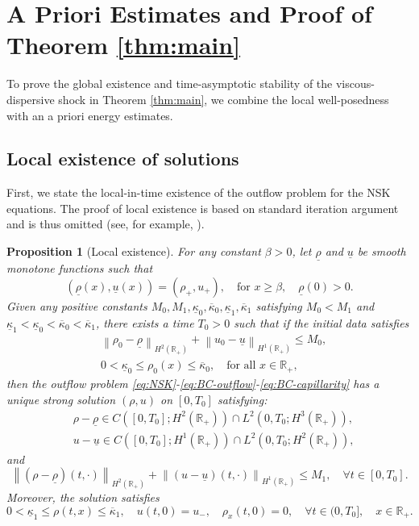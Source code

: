 \documentclass[11pt,reqno]{amsart}
\newtheorem{proposition}{Proposition}[section]
\numberwithin{equation}{section} %
\newcommand{\norm}[1]{\left\lVert#1\right\rVert}
\begin{document}
\section{A Priori Estimates and Proof of Theorem \ref{thm:main}} \label{sec:apriori}
\setcounter{equation}{0}

To prove the global existence and time-asymptotic stability of the viscous-dispersive shock in Theorem \ref{thm:main}, we combine the local well-posedness with an a priori energy estimates.

\subsection{Local existence of solutions} 
First, we state the local-in-time existence of the outflow problem for the NSK equations. %
The proof of local existence is based on standard iteration argument and is thus omitted (see, for example, \cite{HKKL25-JMAA}).

\begin{proposition}[Local existence]\label{prop:loc} 
    For any constant $\beta > 0 $, let $\underline{\rho}$ and $\underline{u}$ be smooth monotone functions such that
    \[
    (\underline{\rho}(x), \underline{u}(x)) = (\rho_+, u_+), \quad \text{for } x \geq \beta, \quad \underline{\rho}(0) > 0.
    \]
    Given any positive constants $M_0, M_1, \underline{\kappa}_0, \overline{\kappa}_0,  \underline{\kappa}_1, \overline{\kappa}_1$ satisfying $M_0 < M_1$ and $\underline{\kappa}_1 < \underline{\kappa}_0 < \overline{\kappa}_0 < \overline{\kappa}_1$, there exists a time $T_0 > 0$ such that if the initial data satisfies
    \begin{align*}
        &\norm{\rho_0 - \underline{\rho}}_{H^2(\mathbb{R}_+)} + \norm{u_0 - \underline{u}}_{H^1(\mathbb{R}_+)} \leq M_0,\\
        &0 < \underline{\kappa}_0 \leq \rho_0(x) \leq \overline{\kappa}_0, \quad \text{for all } x \in \mathbb{R}_+,
    \end{align*}
    then the outflow problem \eqref{eq:NSK}-\eqref{eq:BC-outflow}-\eqref{eq:BC-capillarity} has a unique strong solution $(\rho, u)$ on $[0,T_0]$ satisfying:
\begin{equation*}
\begin{aligned}
    &\rho - \underline{\rho} \in C([0,T_0];H^2(\mathbb{R}_+)) \cap L^2(0,T_0;H^3(\mathbb{R}_+)),\\
    &u - \underline{u} \in C([0,T_0];H^1(\mathbb{R}_+)) \cap L^2(0,T_0;H^2(\mathbb{R}_+)),
\end{aligned} 
\end{equation*}
and
\[
    \norm{(\rho - \underline{\rho})(t,\cdot)}_{H^2(\mathbb{R}_+)} + \norm{(u - \underline{u})(t,\cdot)}_{H^1(\mathbb{R}_+)} \leq M_1, \quad \forall t \in [0, T_0].
\]
Moreover, the solution satisfies
\[
    0<\underline{\kappa}_1 \leq \rho(t,x) \leq \overline{\kappa}_1, \quad u(t,0) = u_-, \quad \rho_x(t,0) = 0, \quad \forall t \in (0, T_0], \quad x \in \mathbb{R}_+.
\]
\end{proposition}
\end{document}
